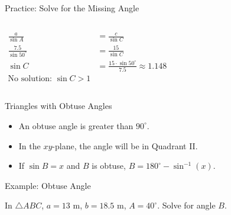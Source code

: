 \documentclass[aspectratio=169]{beamer}
\begin{document}
\begin{frame}{Practice: Solve for the Missing Angle}
    \begin{tcolorbox}[colback=lightgray,colframe=accent,title=Solution]
        \footnotesize
        \begin{columns}
            \begin{align*}
                \frac{a}{\sin A} &= \frac{c}{\sin C} \\
                \frac{7.5}{\sin 50^\circ} &= \frac{15}{\sin C} \\
                \sin C &= \frac{15 \cdot \sin 50^\circ}{7.5} \approx 1.148 \\
                \text{No solution: } \sin C > 1
            \end{align*}
        \end{columns}
    \end{tcolorbox}
\end{frame}

\begin{frame}{Triangles with Obtuse Angles}
    \begin{tcolorbox}[colback=lightgray,colframe=primary,title=Obtuse Angles]
        \footnotesize
        \begin{itemize}
            \item An obtuse angle is greater than $90^\circ$.
            \item In the $xy$-plane, the angle will be in Quadrant II.
            \item If $\sin B = x$ and $B$ is obtuse, $B = 180^\circ - \sin^{-1}(x)$.
        \end{itemize}
    \end{tcolorbox}
\end{frame}

\begin{frame}{Example: Obtuse Angle}
    \begin{tcolorbox}[colback=lightgray,colframe=primary,title=Question]
        \footnotesize
        In $\triangle ABC$, $a = 13$ m, $b = 18.5$ m, $A = 40^\circ$. Solve for angle $B$.
    \end{tcolorbox}
\end{frame}
\end{document}
